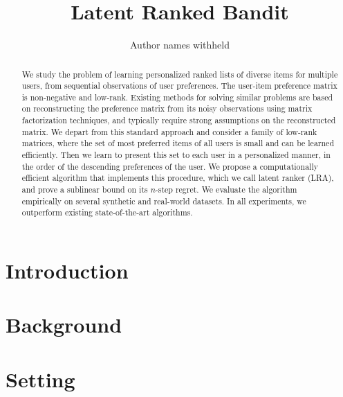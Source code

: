 \documentclass[letterpaper]{article} %
\begin{document}
%
\title{Latent Ranked Bandit}
\author{Author names withheld}
\maketitle
\begin{abstract}
We study the problem of learning personalized ranked lists of diverse items for multiple users, from sequential observations of user preferences. The user-item preference matrix is non-negative and low-rank. Existing methods for solving similar problems are based on reconstructing the preference matrix from its noisy observations using matrix factorization techniques, and typically require strong assumptions on the reconstructed matrix. We depart from this standard approach and consider a family of low-rank matrices, where the set of most preferred items of all users is small and can be learned efficiently. Then we learn to present this set to each user in a personalized manner, in the order of the descending preferences of the user. We propose a computationally efficient algorithm that implements this procedure, which we call latent ranker (LRA), and prove a sublinear bound on its $n$-step regret. We evaluate the algorithm empirically on several synthetic and real-world datasets. In all experiments, we outperform existing state-of-the-art algorithms.
\end{abstract}

\section{Introduction}
\label{sec:introduction}


\section{Background}
\label{sec:background}


\section{Setting}
\label{sec:setting}

\end{document}
